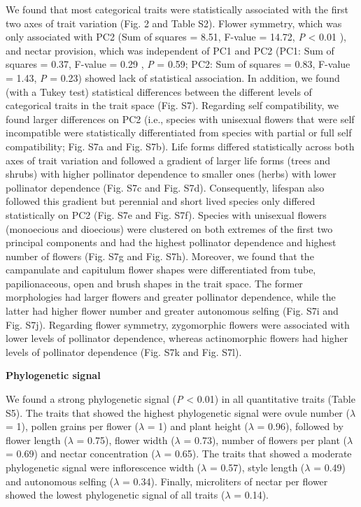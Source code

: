 \documentclass[
  12pt,
  a4paper,
]{article}
\begin{document}
We found that most categorical traits were statistically associated with the first two axes of trait variation (Fig. 2 and Table S2). Flower symmetry, which was only associated with PC2 (Sum of squares = 8.51, F-value = 14.72, \emph{P} \textless{} 0.01 ), and nectar provision, which was independent of PC1 and PC2 (PC1: Sum of squares = 0.37, F-value = 0.29 , \emph{P} = 0.59; PC2: Sum of squares = 0.83, F-value = 1.43, \emph{P} = 0.23) showed lack of statistical association. In addition, we found (with a Tukey test) statistical differences between the different levels of categorical traits in the trait space (Fig. S7). Regarding self compatibility, we found larger differences on PC2 (i.e., species with unisexual flowers that were self incompatible were statistically differentiated from species with partial or full self compatibility; Fig. S7a and Fig. S7b). Life forms differed statistically across both axes of trait variation and followed a gradient of larger life forms (trees and shrubs) with higher pollinator dependence to smaller ones (herbs) with lower pollinator dependence (Fig. S7c and Fig. S7d). Consequently, lifespan also followed this gradient but perennial and short lived species only differed statistically on PC2 (Fig. S7e and Fig. S7f). Species with unisexual flowers (monoecious and dioecious) were clustered on both extremes of the first two principal components and had the highest pollinator dependence and highest number of flowers (Fig. S7g and Fig. S7h). Moreover, we found that the campanulate and capitulum flower shapes were differentiated from tube, papilionaceous, open and brush shapes in the trait space. The former morphologies had larger flowers and greater pollinator dependence, while the latter had higher flower number and greater autonomous selfing (Fig. S7i and Fig. S7j). Regarding flower symmetry, zygomorphic flowers were associated with lower levels of pollinator dependence, whereas actinomorphic flowers had higher levels of pollinator dependence (Fig. S7k and Fig. S7l).

\textbf{Phylogenetic signal}

We found a strong phylogenetic signal (\emph{P} \textless{} 0.01) in all quantitative traits (Table S5). The traits that showed the highest phylogenetic signal were ovule number (\(\lambda\) = 1), pollen grains per flower (\(\lambda\) = 1) and plant height (\(\lambda\) = 0.96), followed by flower length (\(\lambda\) = 0.75), flower width (\(\lambda\) = 0.73), number of flowers per plant (\(\lambda\) = 0.69) and nectar concentration (\(\lambda\) = 0.65). The traits that showed a moderate phylogenetic signal were inflorescence width (\(\lambda\) = 0.57), style length (\(\lambda\) = 0.49) and autonomous selfing (\(\lambda\) = 0.34). Finally, microliters of nectar per flower showed the lowest phylogenetic signal of all traits (\(\lambda\) = 0.14).
\end{document}

